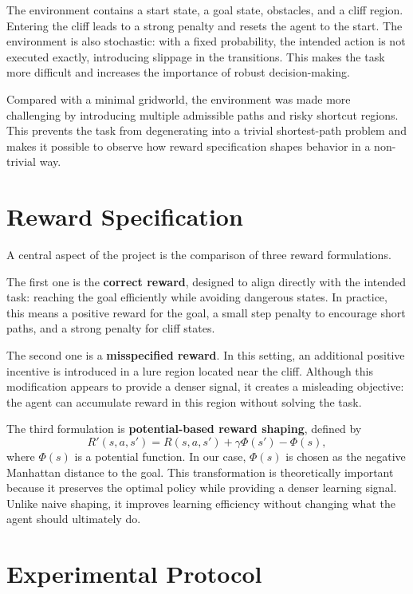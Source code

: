 \documentclass[10pt]{article}
\begin{document}
The environment contains a start state, a goal state, obstacles, and a cliff region. Entering the cliff leads to a strong penalty and resets the agent to the start. The environment is also stochastic: with a fixed probability, the intended action is not executed exactly, introducing slippage in the transitions. This makes the task more difficult and increases the importance of robust decision-making.

Compared with a minimal gridworld, the environment was made more challenging by introducing multiple admissible paths and risky shortcut regions. This prevents the task from degenerating into a trivial shortest-path problem and makes it possible to observe how reward specification shapes behavior in a non-trivial way.

\section{Reward Specification}

A central aspect of the project is the comparison of three reward formulations.

The first one is the \textbf{correct reward}, designed to align directly with the intended task: reaching the goal efficiently while avoiding dangerous states. In practice, this means a positive reward for the goal, a small step penalty to encourage short paths, and a strong penalty for cliff states.

The second one is a \textbf{misspecified reward}. In this setting, an additional positive incentive is introduced in a lure region located near the cliff. Although this modification appears to provide a denser signal, it creates a misleading objective: the agent can accumulate reward in this region without solving the task.

The third formulation is \textbf{potential-based reward shaping}, defined by
\[
	R'(s,a,s') = R(s,a,s') + \gamma \Phi(s') - \Phi(s),
\]
where $\Phi(s)$ is a potential function. In our case, $\Phi(s)$ is chosen as the negative Manhattan distance to the goal. This transformation is theoretically important because it preserves the optimal policy while providing a denser learning signal. Unlike naive shaping, it improves learning efficiency without changing what the agent should ultimately do.

\section{Experimental Protocol}
\end{document}
